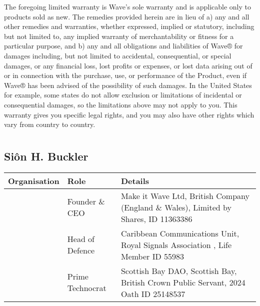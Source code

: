 \documentclass[letterpaper,10pt,english]{sphinxmanual}
\begin{document}
The foregoing limited warranty is Wave’s sole warranty and is applicable only to products sold as new. The remedies provided herein are in lieu of a) any and all other remedies and warranties, whether expressed, implied or statutory, including but not limited to, any implied warranty of merchantability or fitness for a particular purpose, and b) any and all obligations and liabilities of Wave® for damages including, but not limited to accidental, consequential, or special damages, or any financial loss, lost profits or expenses, or lost data arising out of or in connection with the purchase, use, or performance of the Product, even if Wave® has been advised of the possibility of such damages. In the United States for example, some states do not allow exclusion or limitations of incidental or consequential damages, so the limitations above may not apply to you. This warranty gives you specific legal rights, and you may also have other rights which vary from country to country.


\chapter{}
\label{\detokenize{index:document-author-s}}

\section{Siôn H. Buckler}
\label{\detokenize{index:sion-h-buckler}}

\begin{savenotes}\sphinxattablestart
\centering
\begin{tabulary}{\linewidth}[t]{|T|T|T|}
\hline
\sphinxstyletheadfamily 
Organisation
&\sphinxstyletheadfamily 
Role
&\sphinxstyletheadfamily 
Details
\\
\hline
\noindent{}
&
Founder \& CEO
&
Make it Wave Ltd, British Company (England \& Wales), Limited by Shares, ID 11363386
\\
\hline
\noindent{}
&
Head of Defence
&
Caribbean Communications Unit, Royal Signals Association , Life Member ID 55983
\\
\hline
\noindent{}
&
Prime Technocrat
&
Scottish Bay DAO, Scottish Bay, British Crown Public Servant, 2024 Oath ID 25148537
\\
\hline
\end{tabulary}
\par
\sphinxattableend\end{savenotes}
\end{document}

